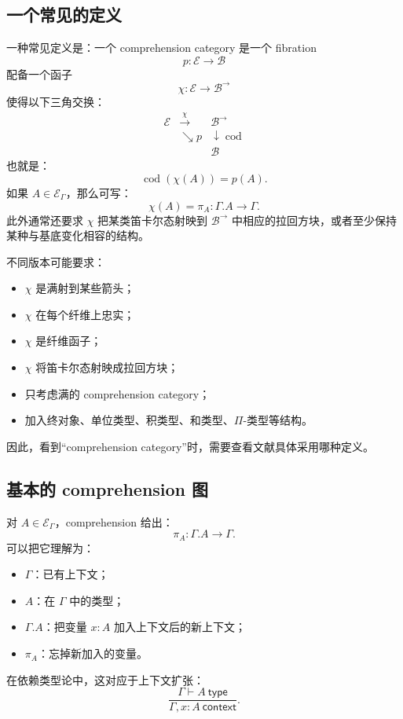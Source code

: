 \documentclass[12pt,a4paper]{article}
\begin{document}
\subsection{一个常见的定义}

一种常见定义是：一个 comprehension category 是一个 fibration
\[
p:\mathcal{E}\to\mathcal{B}
\]
配备一个函子
\[
\chi:\mathcal{E}\to\mathcal{B}^{\to}
\]
使得以下三角交换：
\[
\begin{array}{ccc}
\mathcal{E} & \xrightarrow{\chi} & \mathcal{B}^{\to}\\
& \searrow p & \downarrow\operatorname{cod}\\
&&\mathcal{B}
\end{array}
\]
也就是：
\[
\operatorname{cod}(\chi(A))=p(A).
\]
如果 \(A\in\mathcal{E}_\Gamma\)，那么可写：
\[
\chi(A)=\pi_A:\Gamma.A\to\Gamma.
\]
此外通常还要求 \(\chi\) 把某类笛卡尔态射映到 \(\mathcal{B}^{\to}\) 中相应的拉回方块，或者至少保持某种与基底变化相容的结构。

不同版本可能要求：
\begin{itemize}
  \item \(\chi\) 是满射到某些箭头；
  \item \(\chi\) 在每个纤维上忠实；
  \item \(\chi\) 是纤维函子；
  \item \(\chi\) 将笛卡尔态射映成拉回方块；
  \item 只考虑满的 comprehension category；
  \item 加入终对象、单位类型、积类型、和类型、\(\Pi\)-类型等结构。
\end{itemize}
因此，看到“comprehension category”时，需要查看文献具体采用哪种定义。

\subsection{基本的 comprehension 图}

对 \(A\in\mathcal{E}_\Gamma\)，comprehension 给出：
\[
\pi_A:\Gamma.A\to\Gamma.
\]
可以把它理解为：
\begin{itemize}
  \item \(\Gamma\)：已有上下文；
  \item \(A\)：在 \(\Gamma\) 中的类型；
  \item \(\Gamma.A\)：把变量 \(x:A\) 加入上下文后的新上下文；
  \item \(\pi_A\)：忘掉新加入的变量。
\end{itemize}
在依赖类型论中，这对应于上下文扩张：
\[
\frac{\Gamma\vdash A\ \mathsf{type}}
     {\Gamma,x:A\ \mathsf{context}}.
\]
\end{document}
